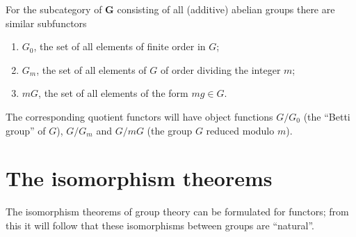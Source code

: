 \documentclass[11pt,a4paper]{report}
\begin{document}
For the subcategory of $\mathbf{G}$ consisting of all (additive) abelian groups there are similar subfunctors
\begin{enumerate}
	\item $G_0$, the set of all elements of finite order in $G$;
	\item $G_m$, the set of all elements of $G$ of order dividing the integer $m$;
	\item $mG$, the set of all elements of the form $m g\in G$.
\end{enumerate}
The corresponding quotient functors will have object functions $G/G_0$ (the ``Betti group'' of $G$), $G/G_m$
and $G/mG$ (the group $G$ reduced modulo $m$).

\section{The isomorphism theorems}\label{sec:iso_thm}
The isomorphism theorems of group theory can be formulated for functors; from this it will follow that these
isomorphisms between groups are ``natural''.
\end{document}
